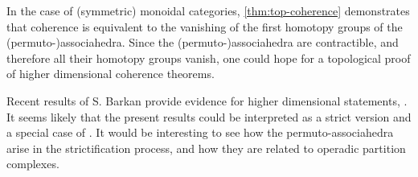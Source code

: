
In the case of (symmetric) monoidal categories, \cref{thm:top-coherence} demonstrates that coherence is equivalent to the vanishing of the first homotopy groups of the (permuto-)associahedra. 
Since the (permuto-)associahedra are contractible, and therefore all their homotopy groups vanish, one could hope for a topological proof of higher dimensional coherence theorems.

Recent results of S. Barkan provide evidence for higher dimensional statements,  \cite{barkanArityApproximationInfty2022}.
It seems likely that the present results could be interpreted as a strict version and a special case of \cite[Thm.~B]{barkanArityApproximationInfty2022}. 
It would be interesting to see how the permuto-associahedra arise in the strictification process, and how they are related to operadic partition complexes.  



